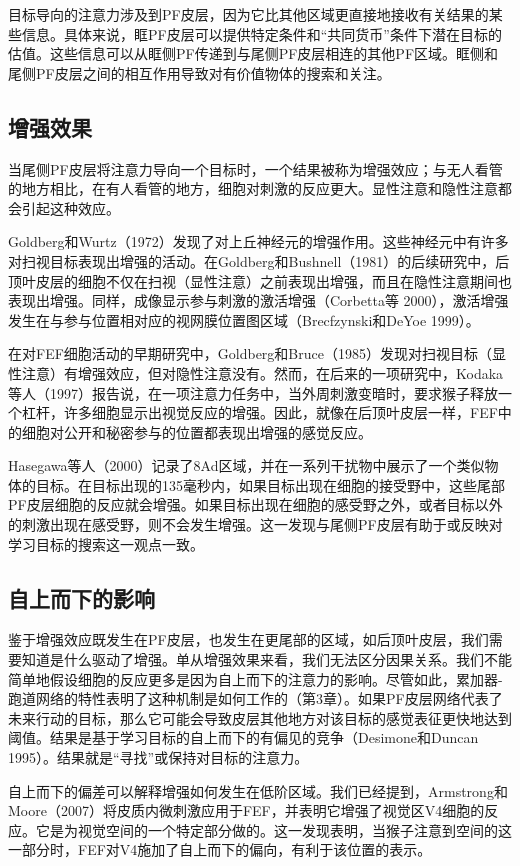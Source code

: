 目标导向的注意力涉及到PF皮层，因为它比其他区域更直接地接收有关结果的某些信息。具体来说，眶PF皮层可以提供特定条件和“共同货币”条件下潜在目标的估值。这些信息可以从眶侧PF传递到与尾侧PF皮层相连的其他PF区域。眶侧和尾侧PF皮层之间的相互作用导致对有价值物体的搜索和关注。

\subsection{增强效果}
当尾侧PF皮层将注意力导向一个目标时，一个结果被称为增强效应；与无人看管的地方相比，在有人看管的地方，细胞对刺激的反应更大。显性注意和隐性注意都会引起这种效应。

Goldberg和Wurtz（1972）发现了对上丘神经元的增强作用。这些神经元中有许多对扫视目标表现出增强的活动。在Goldberg和Bushnell（1981）的后续研究中，后顶叶皮层的细胞不仅在扫视（显性注意）之前表现出增强，而且在隐性注意期间也表现出增强。同样，成像显示参与刺激的激活增强（Corbetta等 2000），激活增强发生在与参与位置相对应的视网膜位置图区域（Brecfzynski和DeYoe 1999）。

在对FEF细胞活动的早期研究中，Goldberg和Bruce（1985）发现对扫视目标（显性注意）有增强效应，但对隐性注意没有。然而，在后来的一项研究中，Kodaka等人（1997）报告说，在一项注意力任务中，当外周刺激变暗时，要求猴子释放一个杠杆，许多细胞显示出视觉反应的增强。因此，就像在后顶叶皮层一样，FEF中的细胞对公开和秘密参与的位置都表现出增强的感觉反应。

Hasegawa等人（2000）记录了8Ad区域，并在一系列干扰物中展示了一个类似物体的目标。在目标出现的135毫秒内，如果目标出现在细胞的接受野中，这些尾部PF皮层细胞的反应就会增强。如果目标出现在细胞的感受野之外，或者目标以外的刺激出现在感受野，则不会发生增强。这一发现与尾侧PF皮层有助于或反映对学习目标的搜索这一观点一致。
\subsection{自上而下的影响}
鉴于增强效应既发生在PF皮层，也发生在更尾部的区域，如后顶叶皮层，我们需要知道是什么驱动了增强。单从增强效果来看，我们无法区分因果关系。我们不能简单地假设细胞的反应更多是因为自上而下的注意力的影响。尽管如此，累加器-跑道网络的特性表明了这种机制是如何工作的（第3章）。如果PF皮层网络代表了未来行动的目标，那么它可能会导致皮层其他地方对该目标的感觉表征更快地达到阈值。结果是基于学习目标的自上而下的有偏见的竞争（Desimone和Duncan 1995）。结果就是“寻找”或保持对目标的注意力。

自上而下的偏差可以解释增强如何发生在低阶区域。我们已经提到，Armstrong和Moore（2007）将皮质内微刺激应用于FEF，并表明它增强了视觉区V4细胞的反应。它是为视觉空间的一个特定部分做的。这一发现表明，当猴子注意到空间的这一部分时，FEF对V4施加了自上而下的偏向，有利于该位置的表示。

